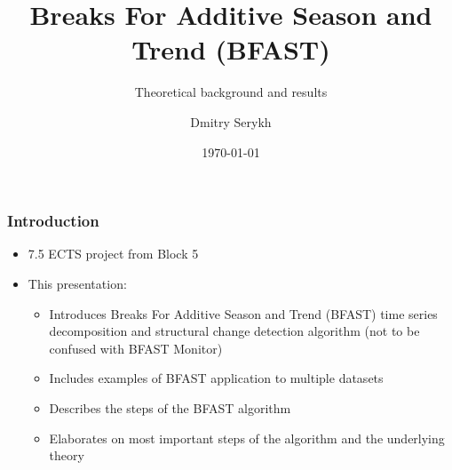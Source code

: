 \documentclass[9pt]{beamer}
\title{Breaks For Additive Season and Trend (BFAST)}
\subtitle{Theoretical background and results}
\institute{Department of Computer Science}
\author{Dmitry Serykh}
\date{\today}
\begin{document}
\frame[plain]{\titlepage}



\begin{frame}
\frametitle{Introduction}
\begin{itemize}
\item 7.5 ECTS project from Block 5
\item This presentation:
\begin{itemize}
  \item Introduces Breaks For Additive Season and Trend (BFAST) time series
    decomposition and structural change
    detection algorithm (not to be confused with BFAST Monitor)
  \item Includes examples of BFAST application to multiple datasets
  \item Describes the steps of the BFAST algorithm
  \item Elaborates on most important steps of the algorithm and the underlying theory
\end{itemize}
\end{itemize}
\end{frame}







\end{document}
